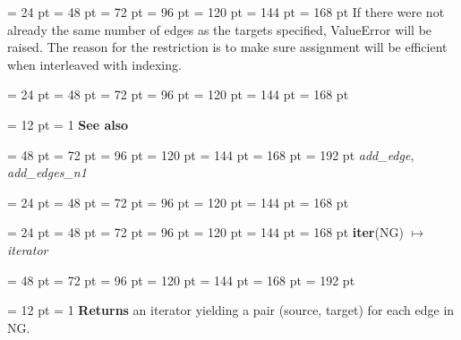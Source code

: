 {{\par}
{\par \noindent  \leftskip = 24 pt  \leftmargini = 48 pt  \leftmarginii = 72 pt  \leftmarginiii = 96 pt  \leftmarginiv = 120 pt  \leftmarginv = 144 pt  \leftmarginvi = 168 pt 
If there were not already the same number of edges as the targets specified,
ValueError will be raised. The reason for the restriction is to make sure
assignment will be efficient when interleaved with indexing.\par}
{\par \noindent  \leftskip = 24 pt  \leftmargini = 48 pt  \leftmarginii = 72 pt  \leftmarginiii = 96 pt  \leftmarginiv = 120 pt  \leftmarginv = 144 pt  \leftmarginvi = 168 pt {\par \noindent
{\par \pagebreak[3.200000] \noindent \hangindent = 12 pt \hangafter = 1 
{\bf {\large {\bf See also\/}}\/}\par}
{\par \noindent  \leftskip = 48 pt  \leftmargini = 72 pt  \leftmarginii = 96 pt  \leftmarginiii = 120 pt  \leftmarginiv = 144 pt  \leftmarginv = 168 pt  \leftmarginvi = 192 pt   {\em add{\_}edge\/},  {\em add{\_}edges{\_}n1\/}\par}
\par}
\par}
{\par \noindent  \leftskip = 24 pt  \leftmargini = 48 pt  \leftmarginii = 72 pt  \leftmarginiii = 96 pt  \leftmarginiv = 120 pt  \leftmarginv = 144 pt  \leftmarginvi = 168 pt {\par \noindent
\par}
\par}
{\par \noindent  \leftskip = 24 pt  \leftmargini = 48 pt  \leftmarginii = 72 pt  \leftmarginiii = 96 pt  \leftmarginiv = 120 pt  \leftmarginv = 144 pt  \leftmarginvi = 168 pt {\large {\bf iter\/}}(NG) \(\mapsto \)  {\em iterator\/}{\par \noindent
{\par \noindent  \leftskip = 48 pt  \leftmargini = 72 pt  \leftmarginii = 96 pt  \leftmarginiii = 120 pt  \leftmarginiv = 144 pt  \leftmarginv = 168 pt  \leftmarginvi = 192 pt {\par \noindent
{\par \pagebreak[3.100000] \noindent \hangindent = 12 pt \hangafter = 1 
{\bf Returns \/} an iterator yielding a pair (source, target) for each edge in NG.
\par}
\par}
}}}}
